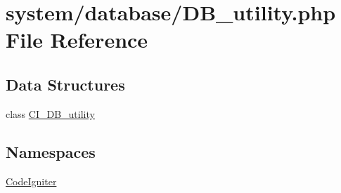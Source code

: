 \hypertarget{_d_b__utility_8php}{}\section{system/database/\+D\+B\+\_\+utility.php File Reference}
\label{_d_b__utility_8php}
\subsection*{Data Structures}
\begin{DoxyCompactItemize}
\item 
class \mbox{\hyperlink{class_c_i___d_b__utility}{C\+I\+\_\+\+D\+B\+\_\+utility}}
\end{DoxyCompactItemize}
\subsection*{Namespaces}
\begin{DoxyCompactItemize}
\item 
 \mbox{\hyperlink{namespace_code_igniter}{Code\+Igniter}}
\end{DoxyCompactItemize}

